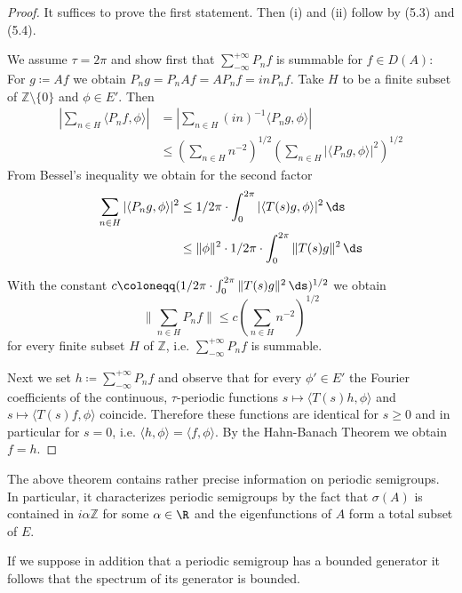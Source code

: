 \begin{proof}
It suffices to prove the first statement. Then (i) and (ii) follow by (5.3) and (5.4).

We assume $\tau = 2\pi$ and show first that $\sum_{-\infty}^{+\infty} P_{n}f$ is summable for $f \in D(A)$: For $g \coloneqq Af$ we obtain $P_{n}g = P_{n}Af = AP_{n}f = inP_{n}f$.
Take $H$ to be a finite subset of $\mathbb{Z} \setminus \{0\}$ and $\phi \in E'$. Then
\begin{align*}
\left|\sum_{n \in H} \langle P_{n}f,\phi \rangle\right| 
&= \left|\sum_{n \in H} (in)^{-1} \langle P_{n}g,\phi \rangle\right| \\
&\leq (\sum_{n \in H} n^{-2})^{1/2}(\sum_{n \in H} |\langle P_{n}g,\phi \rangle|^{2})^{1/2}
\end{align*}
From Bessel's inequality we obtain for the second factor
\begin{align*}
\sum_{n \in H} |\langle P_{n}g,\phi \rangle|^{2} &\leq 1/2\pi \cdot \int_{0}^{2\pi} |\langle T(s)g,\phi \rangle|^{2} \, \ds \\
&\leq \|\phi\|^{2} \cdot 1/2\pi \cdot \int_{0}^{2\pi} \|T(s)g\|^{2} \, \ds
\end{align*}

With the constant $c \coloneqq (1/2\pi \cdot \int_{0}^{2\pi} \|T(s)g\|^{2} \, \ds)^{1/2}$ we obtain
\[
\|\sum_{n \in H} P_{n}f\| \leq c(\sum_{n \in H} n^{-2})^{1/2}
\]
for every finite subset $H$ of $\mathbb{Z}$, i.e. $\sum_{-\infty}^{+\infty} P_{n}f$ is summable.

Next we set $h \coloneqq \sum_{-\infty}^{+\infty} P_{n}f$ and observe that for every $\phi' \in E'$ the Fourier coefficients of the continuous, $\tau$-periodic functions
$s \mapsto \langle T(s)h,\phi \rangle$ and $s \mapsto \langle T(s)f,\phi \rangle$
coincide.
Therefore these functions are identical for $s \geq 0$ and in particular for $s = 0$, i.e. $\langle h,\phi \rangle = \langle f,\phi \rangle$.
By the Hahn-Banach Theorem we obtain $f = h$.
\end{proof}

The above theorem contains rather precise information on periodic semigroups.
In particular, it characterizes periodic semigroups by the fact that $\sigma(A)$ is contained in $i\alpha\mathbb{Z}$ for some $\alpha \in \R$ and the eigenfunctions of $A$ form a total subset of $E$.

If we suppose in addition that a periodic semigroup has a bounded generator it follows that the spectrum of its generator is bounded.



